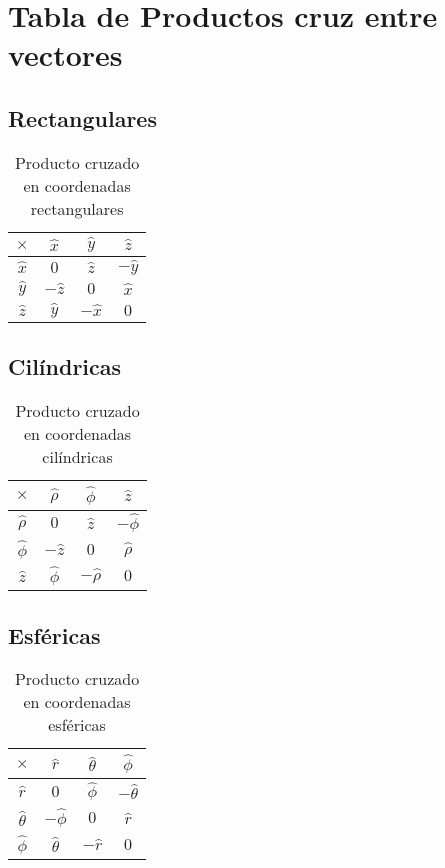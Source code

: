 \documentclass[11pt]{article}
\begin{document}
\section{Tabla de Productos cruz entre vectores}
\subsection{Rectangulares}
\begin{table}[H]
\centering
\begin{tabular}{c|ccc}
$\times$ & $\hat{x}$ & $\hat{y}$ & $\hat{z}$ \\
\hline
$\hat{x}$ & $0$ & $\hat{z}$ & $-\hat{y}$ \\
$\hat{y}$ & $-\hat{z}$ & $0$ & $\hat{x}$ \\
$\hat{z}$ & $\hat{y}$ & $-\hat{x}$ & $0$
\end{tabular}
\caption{Producto cruzado en coordenadas rectangulares}
\end{table}
\subsection{Cilíndricas}

\begin{table}[H]
\centering
\begin{tabular}{c|ccc}
$\times$ & $\hat{\rho}$ & $\hat{\phi}$ & $\hat{z}$ \\
\hline
$\hat{\rho}$ & $0$ & $\hat{z}$ & $-\hat{\phi}$ \\
$\hat{\phi}$ & $-\hat{z}$ & $0$ & $\hat{\rho}$ \\
$\hat{z}$ & $\hat{\phi}$ & $-\hat{\rho}$ & $0$
\end{tabular}
\caption{Producto cruzado en coordenadas cilíndricas}
\end{table}


\subsection{Esféricas}

\begin{table}[H]
\centering
\begin{tabular}{c|ccc}
$\times$ & $\hat{r}$ & $\hat{\theta}$ & $\hat{\phi}$ \\
\hline
$\hat{r}$ & $0$ & $\hat{\phi}$ & $-\hat{\theta}$ \\
$\hat{\theta}$ & $-\hat{\phi}$ & $0$ & $\hat{r}$ \\
$\hat{\phi}$ & $\hat{\theta}$ & $-\hat{r}$ & $0$
\end{tabular}
\caption{Producto cruzado en coordenadas esféricas}
\end{table}
\end{document}
